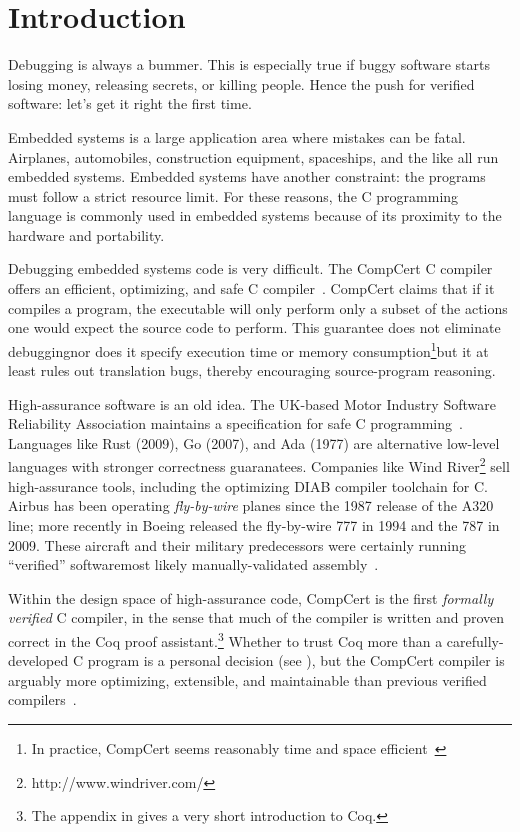 \section{Introduction}

Debugging is always a bummer.
This is especially true if buggy software starts losing money, releasing secrets, or killing people.
Hence the push for verified software: let's get it right the first time.

Embedded systems is a large application area where mistakes can be fatal.
Airplanes, automobiles, construction equipment, spaceships, and the like all run embedded systems.
Embedded systems have another constraint: the programs must follow a strict resource limit.
For these reasons, the C programming language is commonly used in embedded systems because of its proximity to the hardware and portability.

Debugging embedded systems code is very difficult.
The CompCert C compiler offers an efficient, optimizing, and safe C compiler~\cite{l-verified}.
CompCert claims that if it compiles a program, the executable will only perform only a subset of the actions one would expect the source code to perform.
This guarantee does not eliminate debugging\textemdash nor does it specify execution time or memory consumption\footnote{In practice, CompCert seems reasonably time and space efficient~\cite{website,airbus-slides}}\textemdash but it at least rules out translation bugs, thereby encouraging source-program reasoning.

High-assurance software is an old idea.
The UK-based Motor Industry Software Reliability Association maintains a specification for safe C programming~\cite{misra-spec}.
Languages like Rust (2009), Go (2007), and Ada (1977) are alternative low-level languages with stronger correctness guaranatees.
Companies like Wind River\footnote{http://www.windriver.com/} sell high-assurance tools, including the optimizing DIAB compiler toolchain for C.
Airbus has been operating \emph{fly-by-wire} planes since the 1987 release of the A320 line; more recently in Boeing released the fly-by-wire 777 in 1994 and the 787 in 2009.
These aircraft and their military predecessors were certainly running ``verified'' software\textemdash most likely manually-validated assembly~\cite{}.

Within the design space of high-assurance code, CompCert is the first \emph{formally verified} C compiler, in the sense that much of the compiler is written and proven correct in the Coq proof assistant.\footnote{The appendix in  gives a very short introduction to Coq.}
Whether to trust Coq more than a carefully-developed C program is a personal decision (see ), but the CompCert compiler is arguably more optimizing, extensible, and maintainable than previous verified compilers~\cite{airbus-slides}.



